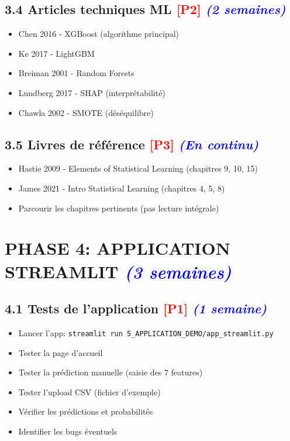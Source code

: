 \documentclass[a4paper,11pt]{article}
\newcommand{\checkbox}{\large$\square$}
\newcommand{\priorite}[1]{\textcolor{red}{\textbf{[#1]}}}
\newcommand{\duree}[1]{\textcolor{blue}{\textit{(#1)}}}
\begin{document}
\subsection*{3.4 Articles techniques ML \priorite{P2} \duree{2 semaines}}

\begin{itemize}[label=\checkbox]
    \item Chen 2016 - XGBoost (algorithme principal)
    \item Ke 2017 - LightGBM
    \item Breiman 2001 - Random Forests
    \item Lundberg 2017 - SHAP (interprétabilité)
    \item Chawla 2002 - SMOTE (déséquilibre)
\end{itemize}

\subsection*{3.5 Livres de référence \priorite{P3} \duree{En continu}}

\begin{itemize}[label=\checkbox]
    \item Hastie 2009 - Elements of Statistical Learning (chapitres 9, 10, 15)
    \item James 2021 - Intro Statistical Learning (chapitres 4, 5, 8)
    \item Parcourir les chapitres pertinents (pas lecture intégrale)
\end{itemize}

\newpage

\section*{PHASE 4: APPLICATION STREAMLIT \duree{3 semaines}}

\subsection*{4.1 Tests de l'application \priorite{P1} \duree{1 semaine}}

\begin{itemize}[label=\checkbox]
    \item Lancer l'app: \texttt{streamlit run 5\_APPLICATION\_DEMO/app\_streamlit.py}
    \item Tester la page d'accueil
    \item Tester la prédiction manuelle (saisie des 7 features)
    \item Tester l'upload CSV (fichier d'exemple)
    \item Vérifier les prédictions et probabilités
    \item Identifier les bugs éventuels
\end{itemize}
\end{document}
